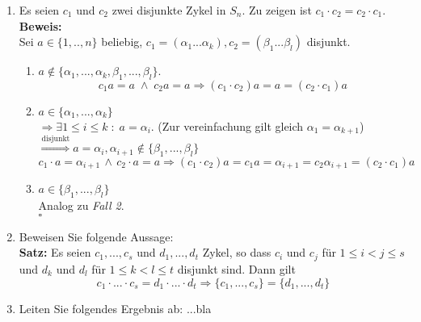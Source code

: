 \documentclass[11pt,a4paper,ngerman]{article}
\begin{document}
\begin{enumerate}[\bfseries a)]
\item Es seien $c_1$ und $c_2$ zwei disjunkte Zykel in $S_n$. Zu zeigen ist $c_1 \cdot c_2 = c_2 \cdot c_1$.\\

\textbf{Beweis:}\\
Sei $a \in \{ 1 ,.. ,n \}$ beliebig, $c_1 = \left( \alpha_1 ... \alpha_k \right), c_2 = \left( \beta_1  ...  \beta_l \right)$ disjunkt.\\

\begin{enumerate}

\item $a \not\in \{ \alpha_1, ... , \alpha_k , \beta_1 , ... , \beta_l \}$.\\
$$c_1 a = a \; \land \; c_2 a = a \Longrightarrow (c_1 \cdot c_2) a = a = (c_2 \cdot c_1) a$$

\item $a \in \{ \alpha_1 , ... , \alpha_k\}$\\
$\Rightarrow \exists 1 \leq i \leq k \; : \; a = \alpha_i$. (Zur vereinfachung gilt gleich $\alpha_1 = \alpha_{k+1}$)\\
$\stackrel{\text{disjunkt}}{\Rightarrow} a=\alpha_i, \alpha_{i+1} \not\in \{ \beta_1 , ... , \beta_l \}$
$$
c_1 \cdot a = \alpha_{i+1} \, \land \, c_2 \cdot a = a \Longrightarrow (c_1 \cdot c_2) a = c_1 a = \alpha_{i+1} = c_2 \alpha_{i+1} = (c_2 \cdot c_1) a
$$

\item $a \in \{ \beta_1 , ... , \beta_l \}$\\
Analog zu \emph{Fall 2}.\\

\mbox{} \hfill $\square$

\end{enumerate}


\item Beweisen Sie folgende Aussage:\\
\textbf{Satz:} Es seien $c_1, ..., c_s$ und $d_1, ... , d_t$ Zykel, so dass $c_i$ und $c_j$ für $1 \leq i < j \leq s$ und $d_k$ und $d_l$ für $1 \leq k < l \leq t$ disjunkt sind. Dann gilt
$$
c_1 \cdot ... \cdot c_s = d_1 \cdot ... \cdot d_t \Rightarrow \{ c_1 , ..., c_s \} = \{ d_1 , ... , d_t \}
$$

\item Leiten Sie folgendes Ergebnis ab: ...bla
\end{enumerate}
\end{document}
